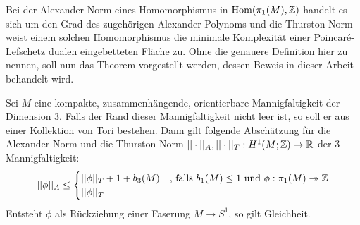     Bei der Alexander-Norm eines Homomorphismus in $\operatorname{Hom}(\pi_1(M),\mathbb{Z})$ handelt es sich um den Grad des zugehörigen Alexander Polynoms und die Thurston-Norm weist einem solchen Homomorphismus die minimale Komplexität einer Poincaré-Lefschetz dualen eingebetteten Fläche zu. Ohne die genauere Definition hier zu nennen, soll nun das Theorem vorgestellt werden, dessen Beweis in dieser Arbeit behandelt wird.
    \begin{thm}[McMullen]
    \label{thm:haupttheorem}
    	Sei $M$ eine kompakte, zusammenhängende, orientierbare Mannigfaltigkeit der Dimension 3. Falls der Rand dieser Mannigfaltigkeit nicht leer ist, so soll er aus einer Kollektion von Tori bestehen. Dann gilt folgende Abschätzung für die Alexander-Norm und die Thurston-Norm $||\cdot||_A ,||\cdot||_T : H^1(M;\mathbb{Z}) \to \mathbb{R}$ der 3-Mannigfaltigkeit:
    	\[
    		||\phi||_A \leq 
    		\begin{cases}
    			||\phi||_T + 1+ b_3(M) &\text{, falls } b_1(M)\leq 1 \text{ und } \phi: \pi_1(M) \twoheadrightarrow \mathbb{Z} \\
    			||\phi||_T &
    		\end{cases}
    	\]
    	Entsteht $\phi$ als Rückziehung einer Faserung $M\to S^1$, so gilt Gleichheit.
    \end{thm}